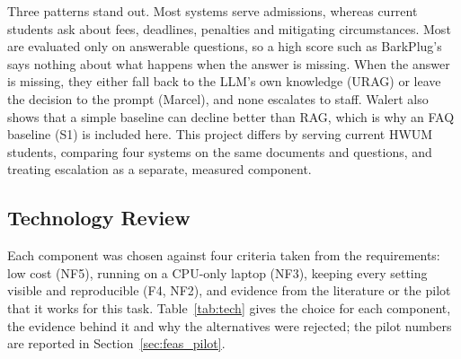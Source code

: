 \documentclass[12pt,nonacm,acmlarge,titlepage,screen]{acmart}
\begin{document}
Three patterns stand out. Most systems serve admissions, whereas current students ask about fees, deadlines, penalties and mitigating circumstances. Most are evaluated only on answerable questions, so a high score such as BarkPlug's says nothing about what happens when the answer is missing. When the answer is missing, they either fall back to the LLM's own knowledge (URAG) or leave the decision to the prompt (Marcel), and none escalates to staff. Walert also shows that a simple baseline can decline better than RAG, which is why an FAQ baseline (S1) is included here. This project differs by serving current HWUM students, comparing four systems on the same documents and questions, and treating escalation as a separate, measured component.

\subsection{Technology Review} \label{sec:back_tech}

Each component was chosen against four criteria taken from the requirements: low cost (NF5), running on a CPU-only laptop (NF3), keeping every setting visible and reproducible (F4, NF2), and evidence from the literature or the pilot that it works for this task. Table~\ref{tab:tech} gives the choice for each component, the evidence behind it and why the alternatives were rejected; the pilot numbers are reported in Section~\ref{sec:feas_pilot}.
\end{document}
